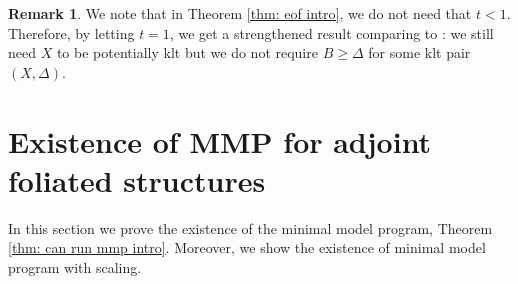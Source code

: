 \documentclass[12pt]{amsart}
\numberwithin{equation}{section}
\theoremstyle{definition}
\theoremstyle{definition}
\newtheorem{rem}[thm]{Remark}
\theoremstyle{definition}
\begin{document}
\begin{rem}
    We note that in Theorem \ref{thm: eof intro}, we do not need that $t<1$. Therefore, by letting $t=1$, we get a strengthened result comparing to \cite[Theorem 1.2(2)]{LMX24b}: we still need $X$ to be potentially klt but we do not require $B\geq\Delta$ for some klt pair $(X,\Delta)$. 
\end{rem}





\section{Existence of MMP for adjoint foliated structures}\label{sec: run mmp}

In this section we prove the existence of the minimal model program, Theorem \ref{thm: can run mmp intro}. Moreover, we show the existence of minimal model program with scaling.
\end{document}
